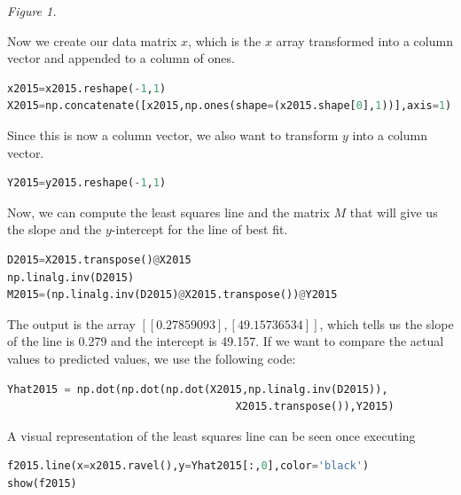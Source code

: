 \documentclass[12pt]{article}
\begin{document}
\begin{center}
    \textit{Figure 1.}
\end{center}

\noindent
Now we create our data matrix $x$, which is the $x$ array transformed into a column vector and appended to a column of ones.
\begin{lstlisting}[language=Python]
x2015=x2015.reshape(-1,1)
X2015=np.concatenate([x2015,np.ones(shape=(x2015.shape[0],1))],axis=1)
\end{lstlisting}

\noindent
Since this is now a column vector, we also want to transform $y$ into a column vector.
\begin{lstlisting}[language=Python]
Y2015=y2015.reshape(-1,1)
\end{lstlisting}

\noindent
Now, we can compute the least squares line and the matrix $M$ that will give us the slope and the $y$-intercept for the line of best fit.
\begin{lstlisting}[language=Python]
D2015=X2015.transpose()@X2015
np.linalg.inv(D2015)
M2015=(np.linalg.inv(D2015)@X2015.transpose())@Y2015
\end{lstlisting}

\noindent
The output is the array $[[0.27859093],[49.15736534]]$, which tells us the slope of the line is 0.279 and the intercept is 49.157. If we want to compare the actual values to predicted values, we use the following code:
\begin{lstlisting}[language=Python]
Yhat2015 = np.dot(np.dot(np.dot(X2015,np.linalg.inv(D2015)),
                                    X2015.transpose()),Y2015)
\end{lstlisting}

\noindent
A visual representation of the least squares line can be seen once executing
\begin{lstlisting}[language=Python]
f2015.line(x=x2015.ravel(),y=Yhat2015[:,0],color='black')
show(f2015)
\end{lstlisting}
\end{document}
